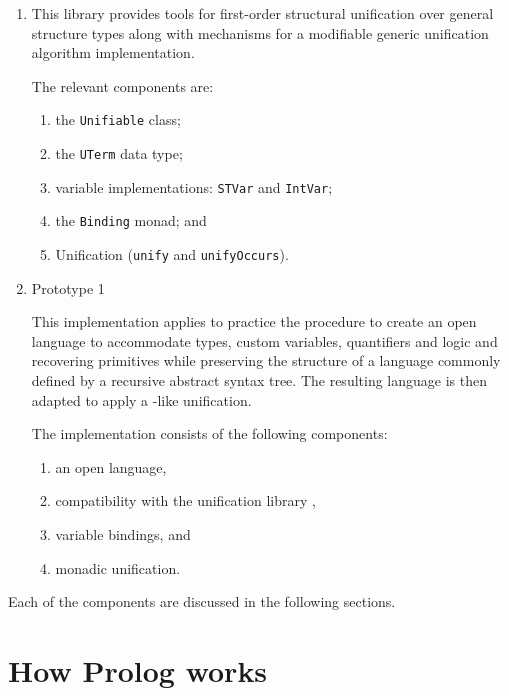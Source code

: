 \documentclass[thesis-solanki.tex]{subfiles}
\begin{document}
\begin{enumerate}
\item {} \cite{unification-fd-lib}

This library provides tools for first-order structural unification over general structure types along with mechanisms for a modifiable
generic unification algorithm implementation.

The relevant components are:
\begin{enumerate}
\item the \Verb!Unifiable! class;

\item the \Verb!UTerm! data type;

\item variable implementations:
  \Verb!STVar! and \Verb!IntVar!;

\item the \Verb!Binding! monad; and 

\item Unification (\Verb!unify! and \Verb!unifyOccurs!).
\end{enumerate}

\item Prototype 1

  This implementation applies to practice the procedure to create an open language to accommodate types,
  custom variables, quantifiers and logic and recovering primitives while preserving the structure of a
  language commonly defined by a recursive abstract syntax tree.
  The resulting language is then adapted to apply a -like unification.

The implementation consists of the following components:
\begin{enumerate}
\item an open language,

\item compatibility with the unification library \cite{unification-fd-lib},

\item variable bindings, and

\item monadic unification.

\end{enumerate}
\end{enumerate}

Each of the components are discussed in the following sections.


\section{How Prolog works}
\end{document}
